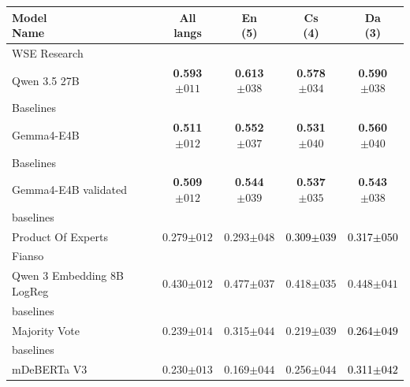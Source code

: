 \begin{tabularx}{\textwidth}{X | c c c c}
\hline
\makecell[b]{\textbf{Model} \\ \textbf{Name}} & \makecell[b]{\textbf{All} \\ \textbf{langs}} & \makecell[b]{\textbf{En} \\ \textbf{(5)}} & \makecell[b]{\textbf{Cs} \\ \textbf{(4)}} & \makecell[b]{\textbf{Da} \\ \textbf{(3)}} \\
\hline
WSE Research\\\subcatarrow{}Qwen 3.5 27B & \textbf{\textcolor{BrickRed}{0.593$\pm{}011$}} & \textbf{\textcolor{BrickRed}{0.613$\pm{}038$}} & \textbf{\textcolor{BrickRed}{0.578$\pm{}034$}} & \textbf{\textcolor{BrickRed}{0.590$\pm{}038$}} \\
Baselines\\\subcatarrow{}Gemma4-E4B & \textbf{\textcolor{White!50!BrickRed}{0.511$\pm{}012$}} & \textbf{\textcolor{White!50!BrickRed}{0.552$\pm{}037$}} & \textbf{\textcolor{BrickRed}{0.531$\pm{}040$}} & \textbf{\textcolor{BrickRed}{0.560$\pm{}040$}} \\
Baselines\\\subcatarrow{}Gemma4-E4B validated & \textbf{\textcolor{White!50!BrickRed}{0.509$\pm{}012$}} & \textbf{\textcolor{White!50!BrickRed}{0.544$\pm{}039$}} & \textbf{\textcolor{BrickRed}{0.537$\pm{}035$}} & \textbf{\textcolor{BrickRed}{0.543$\pm{}038$}} \\
baselines\\\subcatarrow{}Product Of Experts & \textcolor{White!50!NavyBlue}{0.279$\pm{}012$} & \textcolor{White!50!NavyBlue}{0.293$\pm{}048$} & \textcolor{Black}{0.309$\pm{}039$} & \textcolor{Black}{0.317$\pm{}050$} \\
Fianso\\\subcatarrow{}Qwen 3 Embedding 8B LogReg & \textcolor{White!50!BrickRed}{0.430$\pm{}012$} & \textcolor{White!50!BrickRed}{0.477$\pm{}037$} & \textcolor{White!50!BrickRed}{0.418$\pm{}035$} & \textcolor{White!50!BrickRed}{0.448$\pm{}041$} \\
baselines\\\subcatarrow{}Majority Vote & \textcolor{White!50!NavyBlue}{0.239$\pm{}014$} & \textcolor{White!50!NavyBlue}{0.315$\pm{}044$} & \textcolor{White!50!NavyBlue}{0.219$\pm{}039$} & \textcolor{Black}{0.264$\pm{}049$} \\
baselines\\\subcatarrow{}mDeBERTa V3 & \textcolor{White!50!NavyBlue}{0.230$\pm{}013$} & \textcolor{NavyBlue}{0.169$\pm{}044$} & \textcolor{White!50!NavyBlue}{0.256$\pm{}044$} & \textcolor{Black}{0.311$\pm{}042$} \\

\end{tabularx}
